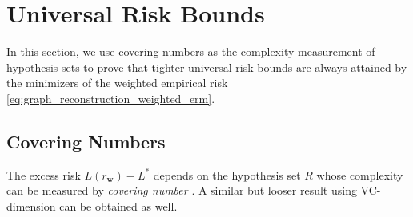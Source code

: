 \documentclass[letterpaper]{article} %
\newcommand{\weight}{\mathbf{w}}
\newcommand{\bayeserror}{L^*}
\newcommand{\risk}{L}
\newcommand{\red}[1]{\textcolor{red}{#1}}
\newcommand{\todo}[1]{\red{\textsc{todo:} #1}}
\newcommand{\citet}[1]{\citeauthor{#1}\ (\citeyear{#1})}
\newcommand{\citep}[3]{(#1\ \citeauthor{#3}\ \citeyear{#3},\ #2)}
\begin{document}

\section{Universal Risk Bounds} %
\label{sec:risk_bounds}
In this section, we use covering numbers as the complexity measurement of hypothesis sets to prove that tighter universal risk bounds are always attained by the minimizers of the weighted empirical risk \eqref{eq:graph_reconstruction_weighted_erm}.

\subsection{Covering Numbers} %
\label{sub:covering number}
The excess risk $\risk{}(r_\weight{})-\bayeserror{}$ depends on the hypothesis set $R$ whose complexity can be measured by \emph{covering number} \cite{cucker2007learning}. 
A similar but looser result using VC-dimension \cite{vapnik1971uniform} can be obtained as well. 
\end{document}
